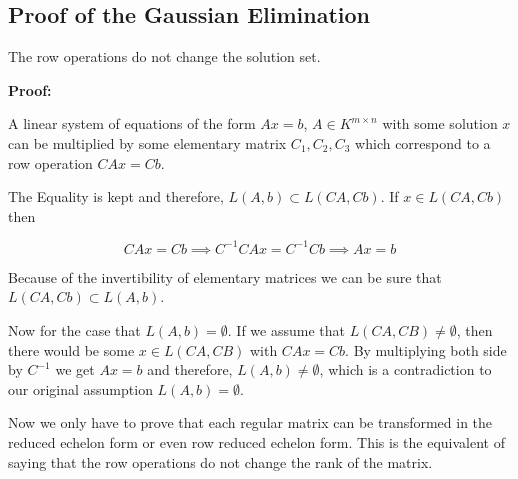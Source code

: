 
\subsection{Proof of the Gaussian Elimination}

The row operations do not change the solution set. 

\textbf{Proof:}

A linear system of equations of the form \(Ax = b\), \(A \in K^{m \times n}\) with some solution
\(x\) can be multiplied by some elementary matrix \(C_1, C_2, C_3\) which correspond to a row 
operation \(CAx = Cb\).

The Equality is kept and therefore, \(L(A,b) \subset L(CA, Cb)\). If \(x \in L(CA, Cb)\) then

\[
	CAx = Cb \implies C^{-1}CAx = C^{-1}Cb \implies Ax = b
\]

Because of the invertibility of elementary matrices we can be sure that  \(L(CA, Cb) \subset L(A,b) \).

Now for the case that \(L(A,b) = \emptyset\). If we assume that \(L(CA,CB) \ne \emptyset \), then 
there would be some \(x \in L(CA,CB)\) with \(CAx = Cb\). By multiplying both side by \(C^{-1}\) we 
get \(Ax = b\) and therefore, \(L(A, b) \ne \emptyset \),  which is a contradiction to our original
assumption  \(L(A,b) = \emptyset\).

\QED

Now we only have to prove that each regular matrix can be transformed in the reduced echelon form or 
even row reduced echelon form. This is the equivalent of saying that the row operations do not change
the rank of the matrix.

